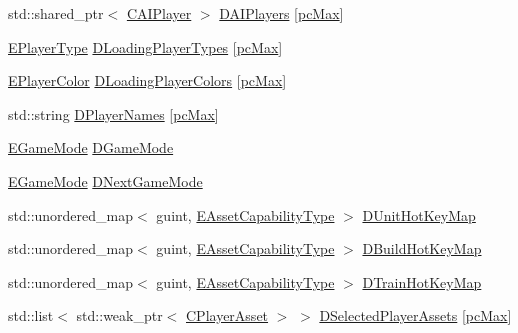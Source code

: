 \begin{DoxyCompactItemize}
\item 
std\+::shared\+\_\+ptr$<$ \hyperlink{classCAIPlayer}{C\+A\+I\+Player} $>$ \hyperlink{classCApplicationData_a839f21d18d88deb29fe1196a8efc6096}{D\+A\+I\+Players} \mbox{[}\hyperlink{GameDataTypes_8h_aafb0ca75933357ff28a6d7efbdd7602fa594a5c8dd3987f24e8a0f23f1a72cd34}{pc\+Max}\mbox{]}
\item 
\hyperlink{classCApplicationData_ae04b6b340297311972ce1e955196fcaa}{E\+Player\+Type} \hyperlink{classCApplicationData_a2ac5711b027842d57aa5f8e5a7adc589}{D\+Loading\+Player\+Types} \mbox{[}\hyperlink{GameDataTypes_8h_aafb0ca75933357ff28a6d7efbdd7602fa594a5c8dd3987f24e8a0f23f1a72cd34}{pc\+Max}\mbox{]}
\item 
\hyperlink{GameDataTypes_8h_aafb0ca75933357ff28a6d7efbdd7602f}{E\+Player\+Color} \hyperlink{classCApplicationData_ab29b80d90f1201608dcb498cd627a6f9}{D\+Loading\+Player\+Colors} \mbox{[}\hyperlink{GameDataTypes_8h_aafb0ca75933357ff28a6d7efbdd7602fa594a5c8dd3987f24e8a0f23f1a72cd34}{pc\+Max}\mbox{]}
\item 
std\+::string \hyperlink{classCApplicationData_a446d88c378b95b1a4f88071612229086}{D\+Player\+Names} \mbox{[}\hyperlink{GameDataTypes_8h_aafb0ca75933357ff28a6d7efbdd7602fa594a5c8dd3987f24e8a0f23f1a72cd34}{pc\+Max}\mbox{]}
\item 
\hyperlink{classCApplicationData_ac8ac37a4c8bb871036fbbdc6a072e403}{E\+Game\+Mode} \hyperlink{classCApplicationData_a2f906f2b4208ecb2a057e6b62e549685}{D\+Game\+Mode}
\item 
\hyperlink{classCApplicationData_ac8ac37a4c8bb871036fbbdc6a072e403}{E\+Game\+Mode} \hyperlink{classCApplicationData_a3b67edeacd70201dcf96fa9fa8aa2107}{D\+Next\+Game\+Mode}
\item 
std\+::unordered\+\_\+map$<$ guint, \hyperlink{GameDataTypes_8h_a35b98ce26aca678b03c6f9f76e4778ce}{E\+Asset\+Capability\+Type} $>$ \hyperlink{classCApplicationData_ae0c7b5849264d7234ffb160d54650f9a}{D\+Unit\+Hot\+Key\+Map}
\item 
std\+::unordered\+\_\+map$<$ guint, \hyperlink{GameDataTypes_8h_a35b98ce26aca678b03c6f9f76e4778ce}{E\+Asset\+Capability\+Type} $>$ \hyperlink{classCApplicationData_accd0e5b0bf28b34b8cce8148eb13de31}{D\+Build\+Hot\+Key\+Map}
\item 
std\+::unordered\+\_\+map$<$ guint, \hyperlink{GameDataTypes_8h_a35b98ce26aca678b03c6f9f76e4778ce}{E\+Asset\+Capability\+Type} $>$ \hyperlink{classCApplicationData_a35798136764b6d2ede555494752e83eb}{D\+Train\+Hot\+Key\+Map}
\item 
std\+::list$<$ std\+::weak\+\_\+ptr$<$ \hyperlink{classCPlayerAsset}{C\+Player\+Asset} $>$ $>$ \hyperlink{classCApplicationData_a05c1087d5a5c4ddc14fcb37444f1642b}{D\+Selected\+Player\+Assets} \mbox{[}\hyperlink{GameDataTypes_8h_aafb0ca75933357ff28a6d7efbdd7602fa594a5c8dd3987f24e8a0f23f1a72cd34}{pc\+Max}\mbox{]}

\end{DoxyCompactItemize}
